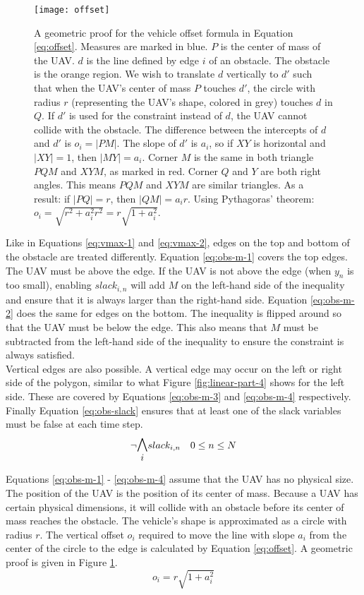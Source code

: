\begin{figure}
    \centering
        \texttt{[image: offset]}
    \caption[A geometric proof for Equation \ref{eq:offset}]{A geometric proof for the vehicle offset formula in Equation \ref{eq:offset}. Measures are marked in blue. $P$ is the center of mass of the UAV. $d$ is the line defined by edge $i$ of an obstacle. The obstacle is the orange region. We wish to translate $d$ vertically to $d'$ such that when the UAV's center of mass $P$ touches $d'$, the circle with radius $r$ (representing the UAV's shape, colored in grey) touches $d$ in $Q$. If $d'$ is used for the constraint instead of $d$, the UAV cannot collide with the obstacle. The difference between the intercepts of $d$ and $d'$ is $o_i = |PM|$. The slope of $d'$ is $a_i$, so if $XY$ is horizontal and $|XY| = 1$, then $|MY| = a_i$. Corner $M$ is the same in both triangle $PQM$ and $XYM$, as marked in red. Corner $Q$ and $Y$ are both right angles. This means $PQM$ and $XYM$ are similar triangles. As a result: if $|PQ| = r$, then $|QM| = a_ir$. Using Pythagoras' theorem: $o_i = \sqrt{r^2 + a_i^2r^2} = r\sqrt{1+a_i^2}$.}\label{fig:offset-proof}
\end{figure}
Like in Equations \ref{eq:vmax-1} and \ref{eq:vmax-2}, edges on the top and bottom of the obstacle are treated differently. Equation \ref{eq:obs-m-1} covers the top edges. The UAV must be above the edge. If the UAV is not above the edge (when $y_n$ is too small), enabling $slack_{i,n}$ will add $M$ on the left-hand side of the inequality and ensure that it is always larger than the right-hand side. Equation \ref{eq:obs-m-2} does the same for edges on the bottom. The inequality is flipped around so that the UAV must be below the edge. This also means that $M$ must be subtracted from the left-hand side of the inequality to ensure the constraint is always satisfied. \\
Vertical edges are also possible. A vertical edge may occur on the left or right side of the polygon, similar to what Figure \ref{fig:linear-part-4} shows for the left side. These are covered by Equations \ref{eq:obs-m-3} and \ref{eq:obs-m-4} respectively.\\
Finally Equation \ref{eq:obs-slack} ensures that at least one of the slack variables must be false at each time step.
\begin{equation}
\neg \mathlarger{\mathlarger{\bigwedge_{i}}} slack_{i,n} \quad 0 \leq n \leq N
\label{eq:obs-slack}
\end{equation}

Equations \ref{eq:obs-m-1} - \ref{eq:obs-m-4} assume that the UAV has no physical size. The position of the UAV is the position of its center of mass. Because a UAV has certain physical dimensions, it will collide with an obstacle before its center of mass reaches the obstacle. The vehicle's shape is approximated as a circle with radius $r$. The vertical offset $o_i$ required to move the line with slope $a_i$ from the center of the circle to the edge is calculated by Equation \ref{eq:offset}. A geometric proof is given in Figure \ref{fig:offset-proof}.
\begin{equation}
o_{i} = r \sqrt{1 + a_i^2}
\label{eq:offset}
\end{equation}

